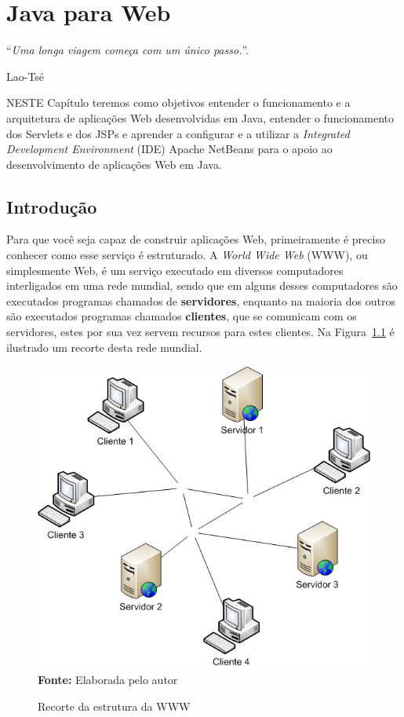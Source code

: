 \chapter{Java para Web}\label{capitulo01}
\epigraph{``\textit{Uma longa viagem começa com um único passo.}''.}{Lao-Tsé}

\lettrine[lines=4, lhang=0.1, lraise=0, loversize=0.2, findent=0.1em]{\textcolor{corAzulTema}{N}}{ESTE} Capítulo teremos como objetivos entender o funcionamento e a arquitetura de aplicações Web desenvolvidas em Java, entender o funcionamento dos Servlets e dos JSPs e aprender a configurar e a utilizar a \textit{Integrated Development Environment} (IDE) Apache NetBeans para o apoio ao desenvolvimento de aplicações Web em Java.


\section{Introdução}

Para que você seja capaz de construir aplicações Web, primeiramente é preciso conhecer como esse serviço é estruturado. A \textit{World Wide Web} (WWW), ou simplesmente Web, é um serviço executado em diversos computadores interligados em uma rede mundial, sendo que em alguns desses computadores são executados programas chamados de \textbf{servidores}, enquanto na maioria dos outros são executados programas chamados \textbf{clientes}, que se comunicam com os servidores, estes por sua vez servem recursos para estes clientes. Na Figura~\ref{fig:cap01ClienteServidor} é ilustrado um recorte desta rede mundial.

\FloatBarrier
\begin{figure}[!htbp]
    \centering
    \caption{Recorte da estrutura da WWW}
    \includegraphics[scale=0.6]{imagens/cap01ClienteServidor}
    \\\textbf{Fonte:} Elaborada pelo autor
    \label{fig:cap01ClienteServidor}
\end{figure}
\FloatBarrier

